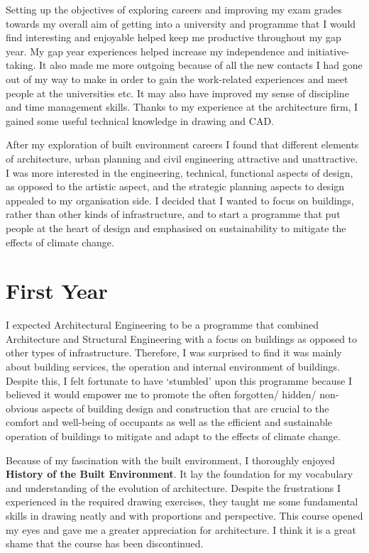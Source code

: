 Setting up the objectives of exploring careers and improving my exam grades towards my overall aim of getting into a university and programme that I would find interesting and enjoyable helped keep me productive throughout my gap year.
My gap year experiences helped increase my independence and initiative-taking.
It also made me more outgoing because of all the new contacts I had gone out of my way to make in order to gain the work-related experiences and meet people at the universities etc.
It may also have improved my sense of discipline and time management skills.
Thanks to my experience at the architecture firm, I gained some useful technical knowledge in drawing and CAD.

After my exploration of built environment careers I found that different elements of architecture, urban planning and civil engineering attractive and unattractive.
I was more interested in the engineering, technical, functional aspects of design, as opposed to the artistic aspect, and the strategic planning aspects to design appealed to my organisation side.
I decided that I wanted to focus on buildings, rather than other kinds of infrastructure, and to start a programme that put people at the heart of design and emphasised on sustainability to mitigate the effects of climate change.



\section{First Year}

I expected Architectural Engineering to be a programme that combined Architecture and Structural Engineering with a focus on buildings as opposed to other types of infrastructure.
Therefore, I was surprised to find it was mainly about building services, the operation and internal environment of buildings.
Despite this, I felt fortunate to have `stumbled' upon this programme because I believed it would empower me to promote the often forgotten/ hidden/ non-obvious aspects of building design and construction that are crucial to the comfort and well-being of occupants as well as the efficient and sustainable operation of buildings to mitigate and adapt to the effects of climate change.

Because of my fascination with the built environment, I thoroughly enjoyed \textbf{History of the Built Environment}.
It lay the foundation for my vocabulary and understanding of the evolution of architecture.
Despite the frustrations I experienced in the required drawing exercises, they taught me some fundamental skills in drawing neatly and with proportions and perspective.
This course opened my eyes and gave me a greater appreciation for architecture.
I think it is a great shame that the course has been discontinued.

